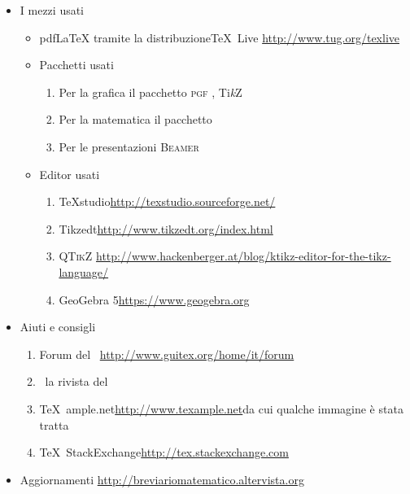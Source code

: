 	\begin{itemize}
		\item I mezzi usati
		\begin{itemize}
			\item pdf\LaTeX{} tramite la distribuzione\TeX{}~Live\newline
			\url{http://www.tug.org/texlive}
			\item Pacchetti usati
			\begin{enumerate}
				\item Per la grafica  il pacchetto \textsc{pgf} \pgfversion, Ti\emph{k}Z
				\item Per la matematica il pacchetto \AmS
				\item Per le presentazioni \textsc{Beamer}
			\end{enumerate}
			\item Editor usati
			\begin{enumerate}
				\item \TeX{}studio\newline \url{http://texstudio.sourceforge.net/} %
				\item Tikzedt\newline \url{http://www.tikzedt.org/index.html} %
				\item \textsc{QTikZ}\newline
				\url{http://www.hackenberger.at/blog/ktikz-editor-for-the-tikz-language/}
				\item GeoGebra 5\newline\url{https://www.geogebra.org}
			\end{enumerate}
		\end{itemize}
		\item Aiuti e consigli
		\begin{enumerate}
			\item Forum del \guit\ \GuITtext\newline \url{http://www.guitex.org/home/it/forum}
			\item \Ars\ la rivista del \guit\
			\item \TeX{}~ample.net\newline \url{http://www.texample.net}\newline da cui qualche immagine è stata tratta
			\item \TeX{}~StackExchange\newline \url{http://tex.stackexchange.com}
		\end{enumerate}
	\item Aggiornamenti
	    \url{http://breviariomatematico.altervista.org}
	\end{itemize}
	\clearpage